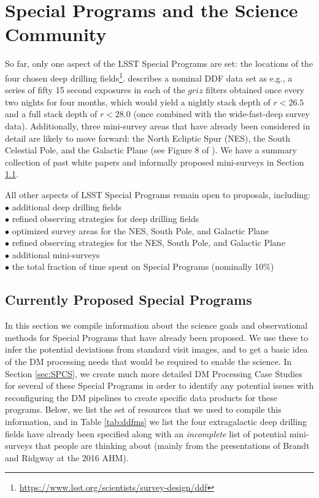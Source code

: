 \documentclass[DM,lsstdraft,toc]{lsstdoc}
\begin{document}
\clearpage
\section{Special Programs and the Science Community}\label{sec:SP_SC}

So far, only one aspect of the LSST Special Programs are set: the locations of the four chosen deep drilling fields\footnote{\url{https://www.lsst.org/scientists/survey-design/ddf}}. \citep{2008arXiv0805.2366I} describes a nominal DDF data set as e.g., a series of fifty 15 second exposures in each of the $griz$ filters obtained once every two nights for four months, which would yield a nightly stack depth of $r<26.5$ and a full stack depth of $r<28.0$ (once combined with the wide-fast-deep survey data). Additionally, three mini-survey areas that have already been considered in detail are likely to move forward: the North Ecliptic Spur (NES), the South Celestial Pole, and the Galactic Plane (see Figure 8 of \citep{2008arXiv0805.2366I}). We have a summary collection of past white papers and informally proposed mini-surveys in Section \ref{ssec:data_science}.

All other aspects of LSST Special Programs remain open to proposals, including: \\
$\bullet$ additional deep drilling fields \\
$\bullet$ refined observing strategies for deep drilling fields \\
$\bullet$ optimized survey areas for the NES, South Pole, and Galactic Plane \\
$\bullet$ refined observing strategies for the NES, South Pole, and Galactic Plane \\
$\bullet$ additional mini-surveys \\
$\bullet$ the total fraction of time spent on Special Programs (nominally 10\%)

\subsection{Currently Proposed Special Programs} \label{ssec:data_science}

In this section we compile information about the science goals and observational methods for Special Programs that have already been proposed. We use these to infer the potential deviations from standard visit images, and to get a basic idea of the DM processing needs that would be required to enable the science. In Section \ref{sec:SPCS}, we create much more detailed DM Processing Case Studies for several of these Special Programs in order to identify any potential issues with reconfiguring the DM pipelines to create specific data products for these programs. Below, we list the set of resources that we used to compile this information, and in Table \ref{tab:ddfms} we list the four extragalactic deep drilling fields have already been specified along with an \textit{incomplete} list of potential mini-surveys that people are thinking about (mainly from the presentations of Brandt and Ridgway at the 2016 AHM).
\end{document}
